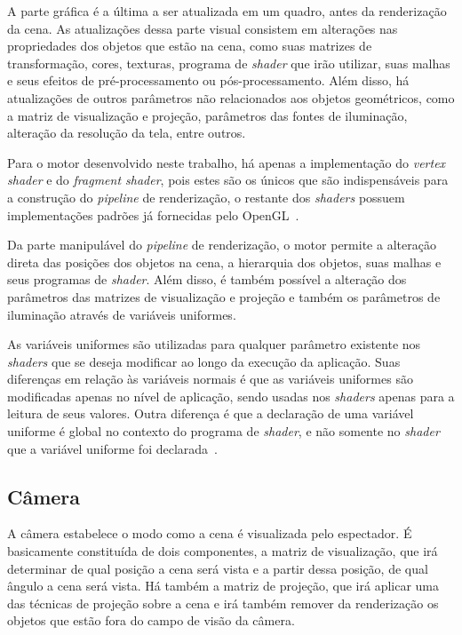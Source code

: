 A parte gráfica é a última a ser atualizada em um quadro, antes da renderização da 
cena. As atualizações dessa parte visual consistem em alterações nas propriedades dos 
objetos que estão na cena, como suas matrizes de transformação, cores, texturas, 
programa de \textit{shader} que irão utilizar, suas malhas e seus efeitos de 
pré-processamento ou pós-processamento. Além disso, há atualizações de outros 
parâmetros não relacionados aos objetos geométricos, como a matriz de visualização e 
projeção, parâmetros das fontes de iluminação, alteração da resolução da tela, entre 
outros.

Para o motor desenvolvido neste trabalho, há apenas a implementação do 
\textit{vertex shader} e do \textit{fragment shader}, pois estes são os únicos que são 
indispensáveis para a construção do \textit{pipeline} de renderização, o restante dos 
\textit{shaders} possuem implementações padrões já fornecidas pelo 
OpenGL~\cite{shreiner2013opengl}.

Da parte manipulável do \textit{pipeline} de renderização, o motor permite a 
alteração direta das posições dos objetos na cena, a hierarquia dos objetos, suas 
malhas e seus programas de \textit{shader}. Além disso, é também possível a alteração 
dos parâmetros das matrizes de visualização e projeção e também os parâmetros de 
iluminação através de variáveis uniformes.

As variáveis uniformes são utilizadas para qualquer parâmetro existente nos 
\textit{shaders} que se deseja modificar ao longo da execução da aplicação. Suas 
diferenças em relação às variáveis normais é que as variáveis uniformes são 
modificadas apenas no nível de aplicação, sendo usadas nos \textit{shaders} apenas 
para a leitura de seus valores. Outra diferença é que a declaração de uma variável 
uniforme é global no contexto do programa de \textit{shader}, e 
não somente no \textit{shader} que a variável uniforme foi 
declarada~\cite{wolff2013opengl}.

\subsection{Câmera}

A câmera estabelece o modo como a cena é visualizada pelo espectador. É basicamente 
constituída de dois componentes, a matriz de visualização, que irá determinar de qual 
posição a cena será vista e a partir dessa posição, de qual ângulo a cena será vista. 
Há também a matriz de projeção, que irá aplicar uma das técnicas de projeção sobre a 
cena e irá também remover da renderização os objetos que estão fora do campo de visão 
da câmera. 

